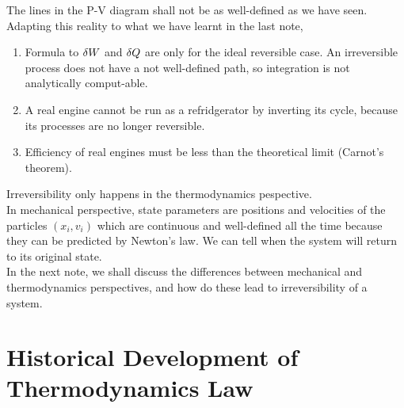\documentclass[class=article, crop=false, 12pt]{standalone}
\begin{document}
The lines in the P-V diagram shall not be as well-defined as we have seen.
Adapting this reality to what we have learnt in the last note,
\begin{enumerate}
    \item Formula to $\var{W}$ and $\var{Q}$ are only for the ideal reversible case. 
    An irreversible process does not have a not well-defined path, so integration is not analytically comput-able.

    \item A real engine cannot be run as a refridgerator by inverting its cycle, 
    because its processes are no longer reversible.

    \item Efficiency of real engines must be less than the theoretical limit (Carnot's theorem).
    
    
    
\end{enumerate}

\begin{notation}
    Irreversibility only happens in the thermodynamics pespective.\\

    In mechanical perspective, 
    state parameters are positions and velocities of the particles $(x_i, v_i)$
    which are continuous and well-defined all the time
    because they can be predicted by Newton's  law.
    We can tell when the system will return to its original state.\\

    In the next note, we shall discuss the differences between mechanical and thermodynamics perspectives,
    and how do these lead to irreversibility of a system.
\end{notation}



\linesep
\section{Historical Development of Thermodynamics  Law}
\end{document}
